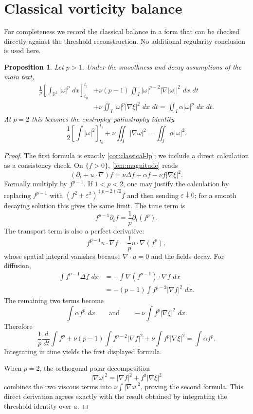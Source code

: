 \documentclass[11pt]{article}
\newtheorem{proposition}[theorem]{Proposition}
\theoremstyle{definition}\newtheorem{definition}[theorem]{Definition}
\theoremstyle{remark}\newtheorem{remark}[theorem]{Remark}
\newcommand{\R}{\mathbb R}\newcommand{\dd}{\,d}\newcommand{\HH}{\mathcal H}
\begin{document}
\appendix
\section{Classical vorticity balance}
For completeness we record the classical balance in a form that can be
checked directly against the threshold reconstruction.  No additional
regularity conclusion is used here.

\begin{proposition}\label{prop:appendix-lp}
Let $p>1$.  Under the smoothness and decay assumptions of the main text,
\[
\begin{aligned}
\frac1p\left[\int_{\R^3}|\omega|^p\,\dd x\right]_{t_0}^{t_1}
&+\nu(p-1)\iint_I |\omega|^{p-2}|\nabla|\omega||^2\,\dd x\,\dd t\\
&+\nu\iint_I |\omega|^p|\nabla\xi|^2\,\dd x\,\dd t
=\iint_I \alpha|\omega|^p\,\dd x\,\dd t.
\end{aligned}
\]
At $p=2$ this becomes the enstrophy--palinstrophy identity
\[
\boxed{
\frac12\left[\int|\omega|^2\right]_{t_0}^{t_1}
+\nu\iint_I|\nabla\omega|^2
=\iint_I\alpha|\omega|^2.
}
\]
\end{proposition}
\begin{proof}
The first formula is exactly \cref{cor:classical-lp}; we include a direct
calculation as a consistency check.  On $\{f>0\}$,
\cref{lem:magnitude} reads
\[
(\partial_t+u\cdot\nabla)f
=\nu\Delta f+\alpha f-\nu f|\nabla\xi|^2.
\]
Formally multiply by $f^{p-1}$.  If $1<p<2$, one may justify the calculation
by replacing $f^{p-1}$ with
$(f^2+\varepsilon^2)^{(p-2)/2}f$ and then sending
$\varepsilon\downarrow0$; for a smooth decaying solution this gives the same
limit.  The time term is
\[
f^{p-1}\partial_tf=\frac1p\partial_t(f^p).
\]
The transport term is also a perfect derivative:
\[
f^{p-1}u\cdot\nabla f
=\frac1p u\cdot\nabla(f^p),
\]
whose spatial integral vanishes because $\nabla\cdot u=0$ and the fields
decay.  For diffusion,
\[
\begin{aligned}
\int f^{p-1}\Delta f\,\dd x
&=-\int\nabla(f^{p-1})\cdot\nabla f\,\dd x\\
&=-(p-1)\int f^{p-2}|\nabla f|^2\,\dd x.
\end{aligned}
\]
The remaining two terms become
\[
\int \alpha f^p\,\dd x
\qquad\text{and}\qquad
-\nu\int f^p|\nabla\xi|^2\,\dd x.
\]
Therefore
\[
\frac1p\frac{\dd}{\dd t}\int f^p
+\nu(p-1)\int f^{p-2}|\nabla f|^2
+\nu\int f^p|\nabla\xi|^2
=\int\alpha f^p.
\]
Integrating in time yields the first displayed formula.

When $p=2$, the orthogonal polar decomposition
\[
|\nabla\omega|^2=|\nabla f|^2+f^2|\nabla\xi|^2
\]
combines the two viscous terms into $\nu\int|\nabla\omega|^2$, proving the
second formula.  This direct derivation agrees exactly with the result obtained
by integrating the threshold identity over $a$.
\end{proof}
\end{document}
